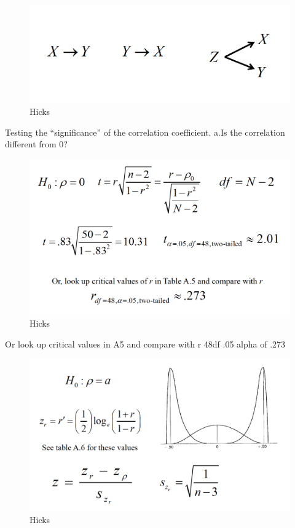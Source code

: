 \documentclass[]{book}
\theoremstyle{definition}
\theoremstyle{definition}
\theoremstyle{definition}
\theoremstyle{remark}
\begin{document}
{\begin{figure}
\centering
\includegraphics{img/hickscor14.png}
\caption{Hicks}
\end{figure}

Testing the ``significance'' of the correlation coefficient. a.Is the
correlation different from 0?

\begin{figure}
\centering
\includegraphics{img/hickscor15.png}
\caption{Hicks}
\end{figure}

Or look up critical values in A5 and compare with r 48df .05 alpha of
.273

\begin{figure}
\centering
\includegraphics{img/hickscor16.png}
\caption{Hicks}
\end{figure}

}
\end{document}
